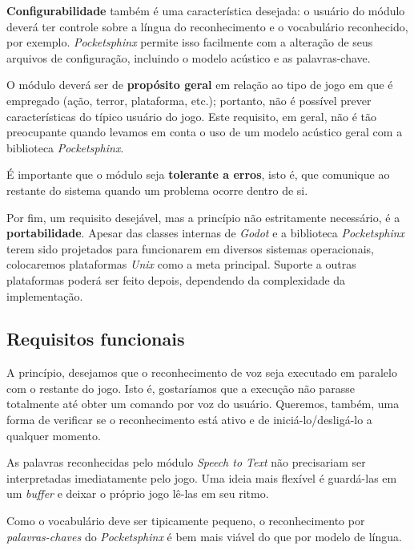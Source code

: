 \textbf{Configurabilidade} também é uma característica desejada: o usuário do módulo deverá ter controle sobre a língua do reconhecimento e o vocabulário reconhecido, por exemplo. \textit{Pocketsphinx} permite isso facilmente com a alteração de seus arquivos de configuração, incluindo o modelo acústico e as palavras-chave.

O módulo deverá ser de \textbf{propósito geral} em relação ao tipo de jogo em que é empregado (ação, terror, plataforma, etc.); portanto, não é possível prever características do típico usuário do jogo. Este requisito, em geral, não é tão preocupante quando levamos em conta o uso de um modelo acústico geral com a biblioteca \textit{Pocketsphinx}.

É importante que o módulo seja \textbf{tolerante a erros}, isto é, que comunique ao restante do sistema quando um problema ocorre dentro de si.

Por fim, um requisito desejável, mas a princípio não estritamente necessário, é a  \textbf{portabilidade}. Apesar das classes internas de \textit{Godot} e a biblioteca \textit{Pocketsphinx} terem sido projetados para funcionarem em diversos sistemas operacionais, colocaremos plataformas \textit{Unix} como a meta principal. Suporte a outras plataformas poderá ser feito depois, dependendo da complexidade da implementação.


\subsection{Requisitos funcionais}
\label{moduleFunctionalRequirements}

A princípio, desejamos que o reconhecimento de voz seja executado em paralelo com o restante do jogo. Isto é, gostaríamos que a execução não parasse totalmente até obter um comando por voz do usuário. Queremos, também, uma forma de verificar se o reconhecimento está ativo e de iniciá-lo/desligá-lo a qualquer momento.

As palavras reconhecidas pelo módulo \textit{Speech to Text} não precisariam ser interpretadas imediatamente pelo jogo. Uma ideia mais flexível é guardá-las em um \textit{buffer} e deixar o próprio jogo lê-las em seu ritmo.


Como o vocabulário deve ser tipicamente pequeno, o reconhecimento por \emph{palavras-chaves} do \textit{Pocketsphinx} é bem mais viável do que por modelo de língua.

